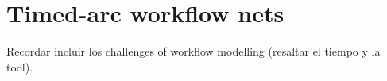 \chapter{Timed-arc workflow nets}\label{chapter:c4}

Recordar incluir los challenges of workflow modelling (resaltar el tiempo y la tool).
